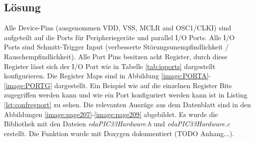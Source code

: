 \subsection{Lösung}
Alle Device-Pins (ausgenommen VDD, VSS, MCLR and OSC1/CLKI) sind aufgeteilt auf die Ports für Peripheriegeräte und parallel I/O Ports. Alle I/O Ports sind Schmitt-Trigger Input (verbesserte Störungsunempfindlichkeit / Rauschempfindlichkeit).\newline
Alle Port Pins besitzen acht Register, durch diese Register lässt sich der I/O Port wie in Tabelle \ref{tab:ioports} dargestellt konfigurieren. Die Register Maps sind in Abbildung \ref{image:PORTA}-\ref{image:PORTG} dargestellt.\newline\newline
Ein Beispiel wie auf die einzelnen Register Bits zugegriffen werden kann und wie ein Port konfiguriert werden kann ist in Listing \ref{lst:confregport} zu sehen.\newline\newline
Die relevanten Auszüge aus dem Datenblatt sind in den Abbildungen \ref{image:page207}-\ref{image:page209} abgebildet.\newline\newline
Es wurde die Bibliothek mit den Dateien \textit{edaPIC33Hardware.h} und \textit{edaPIC33Hardware.c} erstellt. Die Funktion wurde mit Doxygen dokumentiert (TODO Anhang...).

